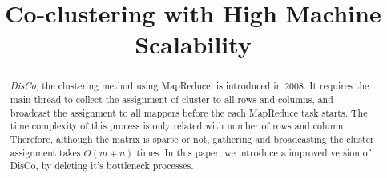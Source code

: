 \documentclass[10pt]{article}
\begin{document}
	
	
	\title{
		Co-clustering with High Machine Scalability
	}
	
	
	
	\maketitle
	
	\begin{abstract}
		\emph{DisCo}, the clustering method using MapReduce, is introduced in 2008. It requires the main thread to collect the assignment of cluster to all rows and columns, and broadcast the assignment to all mappers before the each MapReduce task starts. The time complexity of this process is only related with number of rows and column. Therefore, although the matrix is sparse or not, gathering and broadcasting the cluster assignment takes $O(m+n)$ times. In this paper, we introduce a improved version of DisCo, by deleting it's bottleneck processes.
	\end{abstract}
\end{document}
